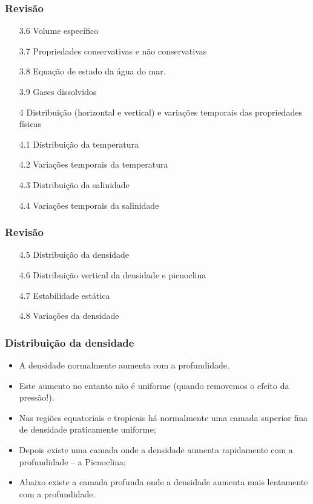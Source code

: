 \begin{frame}
\frametitle{Revisão}
  \begin{itemize}[<+-| alert@+>]
    \item[3.6] Volume específico
    \item[3.7] Propriedades conservativas e não conservativas
    \item[3.8] Equação de estado da água do mar.
    \item[3.9] Gases dissolvidos
    \item[4] Distribuição (horizontal e vertical) e variações temporais das propriedades físicas
    \item[4.1] Distribuição da temperatura
    \item[4.2] Variações temporais da temperatura
    \item[4.3] Distribuição da salinidade
    \item[4.4] Variações temporais da salinidade
  \end{itemize}
\end{frame}


\begin{frame}
\frametitle{Revisão}
  \begin{itemize}[<+-| alert@+>]
    \item[4.5] Distribuição da densidade
    \item[4.6] Distribuição vertical da densidade e picnoclina
    \item[4.7] Estabilidade estática
    \item[4.8] Variações da densidade
  \end{itemize}
\end{frame}


\begin{frame}
\frametitle{Distribuição da densidade}
\footnotesize{
  \begin{itemize}[<+-| alert@+>]
    \item A densidade normalmente aumenta com a profundidade.
    \item Este aumento no entanto não é uniforme (quando removemos o efeito da
          pressão!).
    \item Nas regiões equatoriais e tropicais há normalmente uma camada
          superior fina de densidade praticamente uniforme;
    \item Depois existe uma camada onde a densidade aumenta rapidamente com a
          profundidade -- a Picnoclina;
    \item Abaixo existe a camada profunda onde a densidade aumenta mais
          lentamente com a profundidade.
  \end{itemize}
  }
\end{frame}


